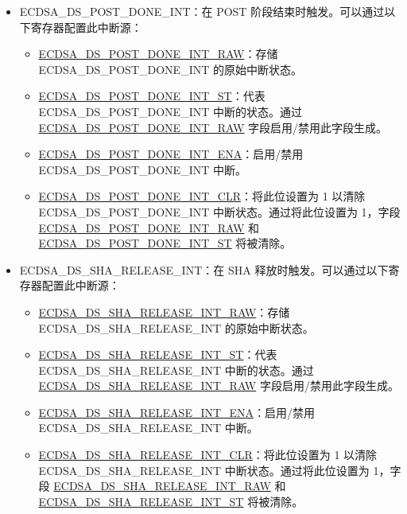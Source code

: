 \documentclass[main\_\_CN.tex]{subfiles}
\begin{document}
\begin{itemize}
\begin{itemize}
	      \end{itemize}
          \item \label{int:ECDSADSPOSTDONEINT}ECDSA\_DS\_POST\_DONE\_INT：在 POST 阶段结束时触发。可以通过以下寄存器配置此中断源：
	      \begin{itemize}
		      \item \hyperref[fielddesc:ECDSADSPOSTDONEINTRAW]{ECDSA\_DS\_POST\_DONE\_INT\_RAW}：存储 ECDSA\_DS\_POST\_DONE\_INT 的原始中断状态。
		      \item \hyperref[fielddesc:ECDSADSPOSTDONEINTST]{ECDSA\_DS\_POST\_DONE\_INT\_ST}：代表 ECDSA\_DS\_POST\_DONE\_INT 中断的状态。通过 \hyperref[fielddesc:ECDSADSPOSTDONEINTRAW]{ECDSA\_DS\_POST\_DONE\_INT\_RAW} 字段启用/禁用此字段生成。
		      \item \hyperref[fielddesc:ECDSADSPOSTDONEINTENA]{ECDSA\_DS\_POST\_DONE\_INT\_ENA}：启用/禁用 ECDSA\_DS\_POST\_DONE\_INT 中断。
		      \item \hyperref[fielddesc:ECDSADSPOSTDONEINTCLR]{ECDSA\_DS\_POST\_DONE\_INT\_CLR}：将此位设置为 1 以清除 ECDSA\_DS\_POST\_DONE\_INT 中断状态。通过将此位设置为 1，字段 \hyperref[fielddesc:ECDSADSPOSTDONEINTRAW]{ECDSA\_DS\_POST\_DONE\_INT\_RAW} 和 \hyperref[fielddesc:ECDSADSPOSTDONEINTST]{ECDSA\_DS\_POST\_DONE\_INT\_ST} 将被清除。
	      \end{itemize}
	\item \label{int:ECDSADSSHARELEASEINT}ECDSA\_DS\_SHA\_RELEASE\_INT：在 SHA 释放时触发。可以通过以下寄存器配置此中断源：
	      \begin{itemize}
		      \item \hyperref[fielddesc:ECDSADSSHARELEASEINTRAW]{ECDSA\_DS\_SHA\_RELEASE\_INT\_RAW}：存储 ECDSA\_DS\_SHA\_RELEASE\_INT 的原始中断状态。
		      \item \hyperref[fielddesc:ECDSADSSHARELEASEINTST]{ECDSA\_DS\_SHA\_RELEASE\_INT\_ST}：代表 ECDSA\_DS\_SHA\_RELEASE\_INT 中断的状态。通过 \hyperref[fielddesc:ECDSADSSHARELEASEINTRAW]{ECDSA\_DS\_SHA\_RELEASE\_INT\_RAW} 字段启用/禁用此字段生成。
		      \item \hyperref[fielddesc:ECDSADSSHARELEASEINTENA]{ECDSA\_DS\_SHA\_RELEASE\_INT\_ENA}：启用/禁用 ECDSA\_DS\_SHA\_RELEASE\_INT 中断。
		      \item \hyperref[fielddesc:ECDSADSSHARELEASEINTCLR]{ECDSA\_DS\_SHA\_RELEASE\_INT\_CLR}：将此位设置为 1 以清除 ECDSA\_DS\_SHA\_RELEASE\_INT 中断状态。通过将此位设置为 1，字段 \hyperref[fielddesc:ECDSADSSHARELEASEINTRAW]{ECDSA\_DS\_SHA\_RELEASE\_INT\_RAW} 和 \hyperref[fielddesc:ECDSADSSHARELEASEINTST]{ECDSA\_DS\_SHA\_RELEASE\_INT\_ST} 将被清除。
	      \end{itemize}
\end{itemize}
\end{document}
